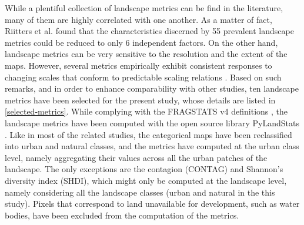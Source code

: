 \documentclass[10pt,letterpaper]{article}
\begin{document}
While a plentiful collection of landscape metrics can be find in the literature, many of them are highly correlated with one another. As a matter of fact, Riitters et al. \cite{riitters1995factor} found that the characteristics discerned by 55 prevalent landscape metrics could be reduced to only 6 independent factors.
On the other hand, landscape metrics can be very sensitive to the resolution and the extent of the maps. However, several metrics empirically exhibit consistent responses to changing scales that conform to predictable scaling relations \cite{wu2002empirical, wu2004effects}.
Based on such remarks, and in order to enhance comparability with other studies, ten landscape metrics have been selected for the present study, whose details are listed in \autoref{selected-metrics}.
While complying with the FRAGSTATS v4 definitions \cite{mcgarigal2012fragstats}, the landscape metrics have been computed with the open source library PyLandStats \cite{bosch2019pylandstats}.
Like in most of the related studies, the categorical maps have been reclassified into urban and natural classes, and the metrics have computed at the urban class level, namely aggregating their values across all the urban patches of the landscape. The only exceptions are the contagion (CONTAG) and Shannon's diversity index (SHDI), which might only be computed at the landscape level, namely considering all the landscape classes (urban and natural in the this study).
Pixels that correspond to land unavailable for development, such as water bodies, have been excluded from the computation of the metrics.
\end{document}
